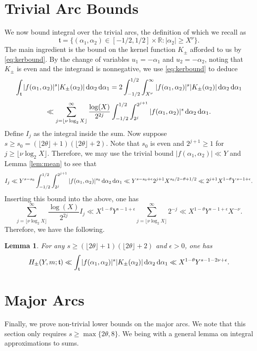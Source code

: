 \documentclass[11pt,reqno]{amsart}
\numberwithin{equation}{section}
\newtheorem{lemma}{Lemma}[section]
\renewcommand{\d}{\,{\rm d}}
\begin{document}
\section{Trivial Arc Bounds} \label{sec:triv}
We now bound integral over the trivial arcs, the definition of which we recall as 
\[ \mathfrak{t} = \{ (\alpha_1, \alpha_2) \in [-1/2,1/2] \times \mathbb{R}: |\alpha_2| \geq X^{\nu} \} .\] 
The main ingredient is the bound on the kernel function $K_{\pm}$ afforded to us by \eqref{eq:kerbound}. By the change of variables $u_1 = -\alpha_1$ and $u_2 = -\alpha_2$, noting that $K_{\pm}$ is even and the integrand is nonnegative, we use \eqref{eq:kerbound} to deduce 
\[ \int_{\mathfrak{t}} |f(\alpha_1,\alpha_2)|^s|K_{\pm}(\alpha_2)| \d\alpha_2\d\alpha_1 =  2\int_{-1/2}^{1/2}\int_{ X^{\nu}}^{\infty} |f(\alpha_1,\alpha_2)|^s|K_{\pm}(\alpha_2)|\d\alpha_2\d\alpha_1 \]
\[ \ll \sum_{j = \lfloor{\nu \log_2 X \rfloor} }^{\infty} \frac{\log(X)}{2^{2j}}\int_{-1/2}^{1/2}\int_{2^j}^{2^{j+1}} |f(\alpha_1,\alpha_2)|^s \d\alpha_2\d\alpha_1 . \] 
Define $I_j$ as the integral inside the sum. Now suppose $s \geq s_0 = (\lfloor 2\theta \rfloor+1)(\lfloor 2\theta \rfloor+2)$. Note that $s_0$ is even and $2^{j+1} \geq 1$ for $j \geq \lfloor \nu \log_2 X \rfloor$. Therefore, we may use the trivial bound $|f(\alpha_1,\alpha_2)| \ll Y$ and Lemma \ref{lem:mean} to see that 
\[ I_j \ll Y^{s-s_0}\int_{-1/2}^{1/2} \int_{2^j}^{2^{j+1}} |f(\alpha_1,\alpha_2)|^{s_0}\d\alpha_2\d\alpha_1 \ll Y^{s-s_0+\epsilon}2^{j+1}X^{s_0/2-\theta+1/2} \ll 2^{j+1}X^{1-\theta} Y^{s-1+\epsilon}.  \]
Inserting this bound into the above, one has 
\[ \sum_{j = \lfloor{\nu \log_2 X \rfloor} }^{\infty} \frac{\log(X)}{2^{2j}} I_j \ll X^{1-\theta}Y^{s-1+\epsilon}\sum_{j=\lfloor{\nu \log_2 X \rfloor}}^{\infty} 2^{-j} \ll X^{1-\theta}Y^{s-1+\epsilon}X^{-\nu}. \]
Therefore, we have the following. 
\begin{lemma} \label{lem:trivial} 
For any $s \geq (\lfloor 2\theta \rfloor+1)(\lfloor 2\theta \rfloor+2)$ and $\epsilon > 0$, one has 
\[ H_{\pm}(Y,m; \mathfrak{t}) \ll \int_{\mathfrak{t}} |f(\alpha_1,\alpha_2)|^{s}|K_{\pm}(\alpha_2)|\d\alpha_2\d\alpha_1 \ll X^{1-\theta}Y^{s-1-2\nu+\epsilon}. \]
\end{lemma}

\section{Major Arcs} \label{sec:maj}
Finally, we prove non-trivial lower bounds on the major arcs. We note that this section only requires $s \geq \max\{ 2\theta, 8\}$. We being with a general lemma on integral approximations to sums. 
\end{document}
